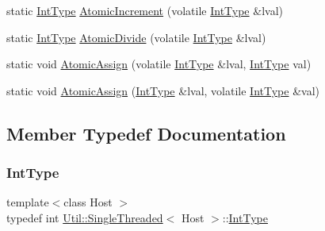 \begin{DoxyCompactItemize}
\item 
static \mbox{\hyperlink{classUtil_1_1SingleThreaded_a35932213fb0c15a7b67ced79bc2af4c6}{Int\+Type}} \mbox{\hyperlink{classUtil_1_1SingleThreaded_a72d41f77da5c6174b1ffb08cb21f1c39}{Atomic\+Increment}} (volatile \mbox{\hyperlink{classUtil_1_1SingleThreaded_a35932213fb0c15a7b67ced79bc2af4c6}{Int\+Type}} \&lval)
\item 
static \mbox{\hyperlink{classUtil_1_1SingleThreaded_a35932213fb0c15a7b67ced79bc2af4c6}{Int\+Type}} \mbox{\hyperlink{classUtil_1_1SingleThreaded_afb0bc74b0e21b32b31c4895fa22a3337}{Atomic\+Divide}} (volatile \mbox{\hyperlink{classUtil_1_1SingleThreaded_a35932213fb0c15a7b67ced79bc2af4c6}{Int\+Type}} \&lval)
\item 
static void \mbox{\hyperlink{classUtil_1_1SingleThreaded_a712bba75b676a88de414ccbd4df775eb}{Atomic\+Assign}} (volatile \mbox{\hyperlink{classUtil_1_1SingleThreaded_a35932213fb0c15a7b67ced79bc2af4c6}{Int\+Type}} \&lval, \mbox{\hyperlink{classUtil_1_1SingleThreaded_a35932213fb0c15a7b67ced79bc2af4c6}{Int\+Type}} val)
\item 
static void \mbox{\hyperlink{classUtil_1_1SingleThreaded_a013f12cfed48924a184b58e9d614dc6a}{Atomic\+Assign}} (\mbox{\hyperlink{classUtil_1_1SingleThreaded_a35932213fb0c15a7b67ced79bc2af4c6}{Int\+Type}} \&lval, volatile \mbox{\hyperlink{classUtil_1_1SingleThreaded_a35932213fb0c15a7b67ced79bc2af4c6}{Int\+Type}} \&val)
\end{DoxyCompactItemize}


\subsection{Member Typedef Documentation}
\mbox{\label{classUtil_1_1SingleThreaded_a35932213fb0c15a7b67ced79bc2af4c6}} 
\subsubsection{\texorpdfstring{IntType}{IntType}\hspace{0.1cm}{\footnotesize\ttfamily [1/3]}}
{\footnotesize\ttfamily template$<$class Host $>$ \\
typedef int \mbox{\hyperlink{classUtil_1_1SingleThreaded}{Util\+::\+Single\+Threaded}}$<$ Host $>$\+::\mbox{\hyperlink{classUtil_1_1SingleThreaded_a35932213fb0c15a7b67ced79bc2af4c6}{Int\+Type}}}

